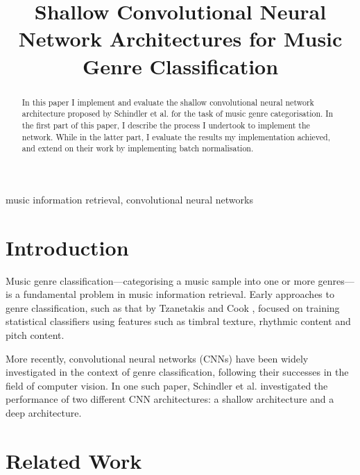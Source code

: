 \documentclass[conference]{IEEEtran}
\begin{document}
\title{Shallow Convolutional Neural Network Architectures for Music Genre Classification}

\author{
}

\maketitle

\begin{abstract}
In this paper I implement and evaluate the shallow convolutional neural network architecture proposed by Schindler et al. \cite{SchindlerLidyRauber} for the task of music genre categorisation.
In the first part of this paper, I describe the process I undertook to implement the network.
While in the latter part, I evaluate the results my implementation achieved, and extend on their work by implementing batch normalisation.
\end{abstract}

\begin{IEEEkeywords}
music information retrieval, convolutional neural networks
\end{IEEEkeywords}

\section{Introduction}

Music genre classification---categorising a music sample into one or more genres---is a fundamental problem in music information retrieval.
Early approaches to genre classification, such as that by Tzanetakis and Cook \cite{TzanetakisCook}, focused on training statistical classifiers using features such as timbral texture, rhythmic content and pitch content.

More recently, convolutional neural networks (CNNs) have been widely investigated in the context of genre classification, following their successes in the field of computer vision.
In one such paper, Schindler et al. \cite{SchindlerLidyRauber} investigated the performance of two different CNN architectures: a shallow architecture and a deep architecture.

\section{Related Work}
\end{document}
